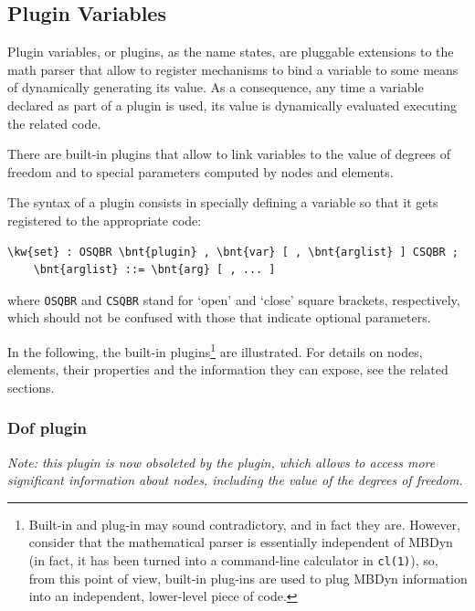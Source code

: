 \subsection{Plugin Variables}
\label{sec:GENERAL:PLUGIN}
Plugin variables, or plugins, as the name states, are pluggable extensions
to the math parser that allow to register mechanisms to bind a variable
to some means of dynamically generating its value.
As a consequence, any time a variable declared as part of a plugin
is used, its value is dynamically evaluated executing the related code.

There are built-in plugins that allow to link variables to the value
of degrees of freedom and to special parameters computed by nodes
and elements.

The syntax of a plugin consists in specially defining a variable
so that it gets registered to the appropriate code:
\begin{Verbatim}[commandchars=\\\{\}]
    \kw{set} : OSQBR \bnt{plugin} , \bnt{var} [ , \bnt{arglist} ] CSQBR ;
    \bnt{arglist} ::= \bnt{arg} [ , ... ]
\end{Verbatim}
where \texttt{OSQBR} and \texttt{CSQBR} stand for `open' and `close'
square brackets, respectively, which should not be confused with those
that indicate optional parameters.

In the following, the built-in plugins\footnote{Built-in and plug-in
may sound contradictory, and in fact they are.  However, consider
that the mathematical parser is essentially independent of MBDyn
(in fact, it has been turned into a command-line calculator
in \texttt{cl(1)}), so, from this point of view, built-in plug-ins
are used to plug MBDyn information into an independent, lower-level
piece of code.} are illustrated.
For details on nodes, elements, their properties and the information
they can expose, see the related sections.

\subsubsection{Dof plugin}
\emph{Note: this plugin is now obsoleted by the  plugin,
which allows to access more significant information about nodes,
including the value of the degrees of freedom.}

